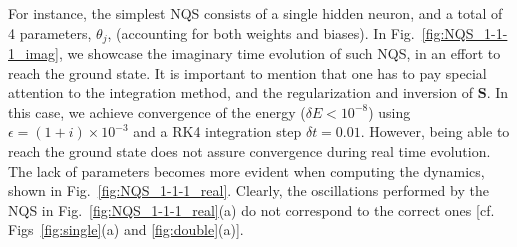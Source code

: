 \documentclass[aps,pre,superscriptaddress,amsmath,amssymb,amsfonts,twocolumn,showpacs,notitlepage]{revtex4-1}
\begin{document}
	For instance, the simplest NQS consists of a single hidden neuron, and a total of 4 parameters, $\theta_j$, (accounting for both weights and biases).
	In Fig.~\ref{fig:NQS_1-1-1_imag}, we showcase the imaginary time evolution of such NQS, in an effort to reach the ground state.
	It is important to mention that one has to pay special attention to the integration method, and the regularization and inversion of $\bm{S}$.
	In this case, we achieve convergence of the energy ($\delta E < 10^{-8}$) using $\epsilon=(1+i)\times10^{-3}$ and a RK4 integration step $\delta t=0.01$.
	However, being able to reach the ground state does not assure convergence during real time evolution.
	The lack of parameters becomes more evident when computing the dynamics, shown in Fig.~\ref{fig:NQS_1-1-1_real}.
	Clearly, the oscillations performed by the NQS in Fig.~\ref{fig:NQS_1-1-1_real}(a) do not correspond to the correct ones [cf. Figs~\ref{fig:single}(a) and \ref{fig:double}(a)].
	
\end{document}
